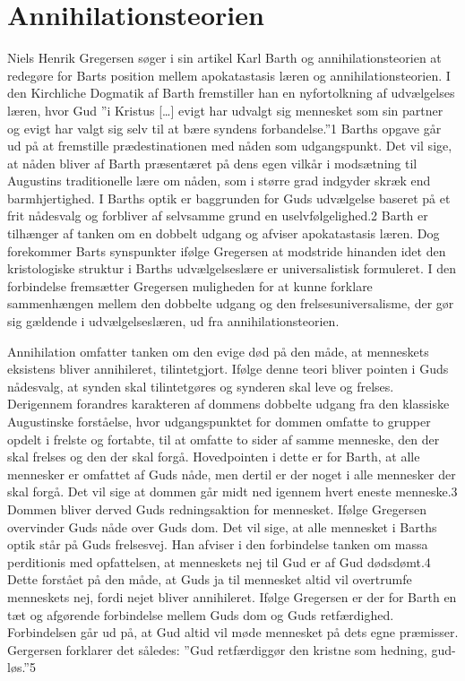 \chapter{Annihilationsteorien}
Niels Henrik Gregersen søger i sin artikel Karl Barth og annihilationsteorien at redegøre for Barts position mellem apokatastasis læren og annihilationsteorien.
I den Kirchliche Dogmatik af Barth fremstiller han en nyfortolkning af udvælgelses læren, hvor Gud ”i Kristus […] evigt har udvalgt sig mennesket som sin partner og evigt har valgt sig selv til at bære syndens forbandelse.”1 Barths opgave går ud på at fremstille prædestinationen med nåden som udgangspunkt. Det vil sige, at nåden bliver af Barth præsentæret på dens egen vilkår i modsætning til Augustins traditionelle lære om nåden, som i større grad indgyder skræk end barmhjertighed. I Barths optik er baggrunden for Guds udvælgelse baseret på et frit nådesvalg og forbliver af selvsamme grund en uselvfølgelighed.2 Barth er tilhænger af tanken om en dobbelt udgang og afviser apokatastasis læren. Dog forekommer Barts synspunkter ifølge Gregersen at modstride hinanden idet den kristologiske struktur i Barths udvælgelseslære er universalistisk formuleret. I den forbindelse fremsætter Gregersen muligheden for at kunne forklare sammenhængen mellem den dobbelte udgang og den frelsesuniversalisme, der gør sig gældende i udvælgelseslæren, ud fra annihilationsteorien.

Annihilation omfatter tanken om den evige død på den måde, at menneskets eksistens bliver annihileret, tilintetgjort. Ifølge denne teori bliver pointen i Guds nådesvalg, at synden skal tilintetgøres og synderen skal leve og frelses. Derigennem forandres karakteren af dommens dobbelte udgang fra den klassiske Augustinske forståelse, hvor udgangspunktet for dommen omfatte to grupper opdelt i frelste og fortabte, til at omfatte to sider af samme menneske, den der skal frelses og den der skal forgå. Hovedpointen i dette er for Barth, at alle mennesker er omfattet af Guds nåde, men dertil er der noget i alle mennesker der skal forgå. Det vil sige at dommen går midt ned igennem hvert eneste menneske.3 Dommen bliver derved Guds redningsaktion for mennesket. Ifølge Gregersen overvinder Guds nåde over Guds dom. Det vil sige, at alle mennesket i Barths optik står på Guds frelsesvej. Han afviser i den forbindelse tanken om massa perditionis med opfattelsen, at menneskets nej til Gud er af Gud dødsdømt.4 Dette forstået på den måde, at Guds ja til mennesket altid vil overtrumfe menneskets nej, fordi nejet bliver annihileret. Ifølge Gregersen er der for Barth en tæt og afgørende forbindelse mellem Guds dom og Guds retfærdighed. Forbindelsen går ud på, at Gud altid vil møde mennesket på dets egne præmisser. Gergersen forklarer det således: ”Gud retfærdiggør den kristne som hedning, gud-løs.”5 

